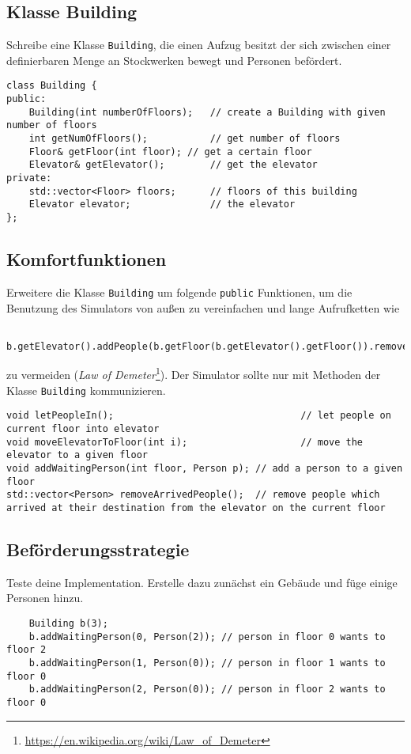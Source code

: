 \subsection{Klasse Building}
Schreibe eine Klasse \lstinline{Building}, die einen Aufzug besitzt der sich zwischen einer definierbaren Menge an Stockwerken bewegt und Personen befördert.

\begin{lstlisting}
class Building {
public:
	Building(int numberOfFloors);	// create a Building with given number of floors
	int getNumOfFloors();			// get number of floors
	Floor& getFloor(int floor);	// get a certain floor
	Elevator& getElevator();		// get the elevator
private:
	std::vector<Floor> floors;		// floors of this building
	Elevator elevator;				// the elevator
};
\end{lstlisting}


\subsection{Komfortfunktionen}
Erweitere die Klasse \lstinline{Building} um folgende \lstinline{public} Funktionen, um die Benutzung des Simulators von außen zu vereinfachen und lange Aufrufketten wie
\begin{lstlisting}
	b.getElevator().addPeople(b.getFloor(b.getElevator().getFloor()).removeAllPeople());
\end{lstlisting}

zu vermeiden (\emph{Law of Demeter}\footnote{\url{https://en.wikipedia.org/wiki/Law_of_Demeter}}).
Der Simulator sollte nur mit Methoden der Klasse \lstinline{Building} kommunizieren.

\begin{lstlisting}
void letPeopleIn();									// let people on current floor into elevator
void moveElevatorToFloor(int i);					// move the elevator to a given floor
void addWaitingPerson(int floor, Person p);	// add a person to a given floor
std::vector<Person> removeArrivedPeople();	// remove people which arrived at their destination from the elevator on the current floor
\end{lstlisting}

\subsection{Beförderungsstrategie}
Teste deine Implementation.
Erstelle dazu zunächst ein Gebäude und füge einige Personen hinzu.

\begin{lstlisting}
	Building b(3);
	b.addWaitingPerson(0, Person(2)); // person in floor 0 wants to floor 2
	b.addWaitingPerson(1, Person(0)); // person in floor 1 wants to floor 0
	b.addWaitingPerson(2, Person(0)); // person in floor 2 wants to floor 0
\end{lstlisting}

